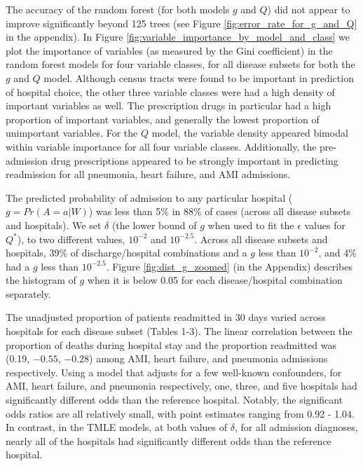 \documentclass[]{article}\usepackage[]{graphicx}\usepackage[]{color}
\begin{document}
The accuracy of the random forest (for both models $g$ and $Q$) did not appear to improve significantly beyond 125 trees (see Figure \ref{fig:error_rate_for_g_and_Q} in the appendix). In Figure \ref{fig:variable_importance_by_model_and_class} we plot the importance of variables (as measured by the Gini coefficient) in the random forest models for four variable classes, for all disease subsets for both the $g$ and $Q$ model. Although census tracts were found to be important in prediction of hospital choice,  the other three variable classes were had a high density of important variables as well. The prescription drugs in particular had a high proportion of important variables, and generally the lowest proportion of unimportant variables. For the $Q$ model, the variable density appeared bimodal within variable importance for all four variable classes. Additionally, the pre-admission drug prescriptions appeared to be strongly important in predicting readmission for all pneumonia, heart failure, and AMI admissions.

The predicted probability of admission to any particular hospital ($g=Pr(A=a|W)$) was less than 5\% in 88\% of cases (across all disease subsets and hospitals).  We set $\delta$ (the lower bound of $g$ when used to fit the $\epsilon$ values for $Q^*$), to two different values, $10^{-2}$ and $10^{-2.5}$. Across all disease subsets and hospitals, 39\% of discharge/hospital combinations and a $g$ less than $10^{-2}$, and 4\% had a $g$ less than $10^{-2.5}$. Figure \ref{fig:dist_g_zoomed} (in the Appendix) describes the histogram of $g$ when it is below 0.05 for each disease/hospital combination separately.

The unadjusted proportion of patients readmitted in 30 days varied across hospitals for each disease subset (Tables 1-3). The linear correlation between the proportion of deaths during hospital stay and the proportion readmitted was (0.19, \ensuremath{-0.55}, \ensuremath{-0.28}) among AMI, heart failure, and pneumonia admissions respectively. Using a model that adjusts for a few well-known confounders, for AMI, heart failure, and pneumonia respectively, one, three, and five hospitals had significantly different odds than the reference hospital. Notably, the significant odds ratios are all relatively small, with point estimates ranging from 0.92 - 1.04. In contrast, in the TMLE models, at both values of $\delta$, for all admission diagnoses, nearly all of the hospitals had significantly different odds than the reference hospital.
\end{document}
